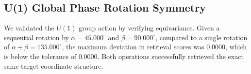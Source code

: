 \subsection{U(1) Global Phase Rotation Symmetry}
We validated the $U(1)$ group action by verifying equivariance. Given a sequential rotation by
$\alpha=45.000^{\circ}$ and $\beta=90.000^{\circ}$, compared to a single rotation of
$\alpha+\beta=135.000^{\circ}$, the maximum deviation in retrieval scores was
$0.0000$, which is below the tolerance of $0.0000$.
Both operations successfully retrieved the exact same target coordinate structure.
